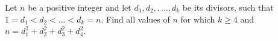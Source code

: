 Let $n$ be a positive integer and let $d_{1},d_{2},,\ldots ,d_{k}$ be its divisors, such that $1=d_{1}<d_{2}<\ldots <d_{k}=n$. Find all values of $n$ for which $k\geq 4$ and $n=d_{1}^{2}+d_{2}^{2}+d_{3}^{2}+d_{4}^{2}$.